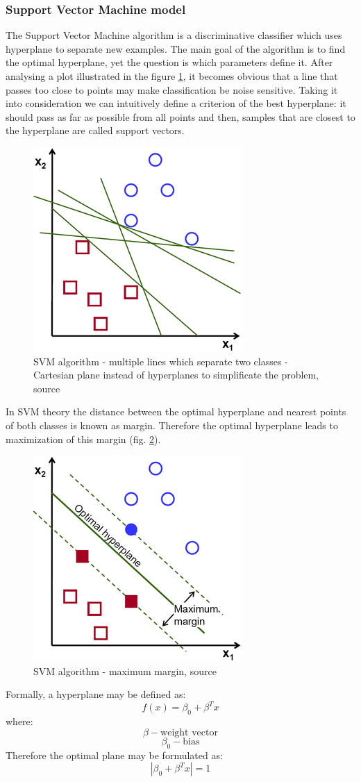 	\subsubsection{Support Vector Machine model} \label{soa-svm}
	The Support Vector Machine algorithm is a discriminative classifier which uses hyperplane to separate new examples. The main goal of the algorithm is to find the optimal hyperplane, yet the question is which parameters define it. After analysing a plot illustrated in the figure \ref{svm-plot}, it becomes obvious that a line that passes too close to points may make classification be noise sensitive.  Taking it into consideration we can intuitively define a criterion of the best hyperplane: it should pass as far as possible from all points and then, samples that are closest to the hyperplane are called support vectors.
		\begin{figure}[H]
	\begin{center}
	\includegraphics[width=0.4\linewidth]{images/svm-plot.png}
	\caption{SVM algorithm - multiple lines which separate two classes - Cartesian plane instead of hyperplanes to simplificate the problem, source \cite{svm-plot} }
	\label{svm-plot}
	\end{center}
	\end{figure}
	In SVM theory the distance between the optimal hyperplane and nearest points of both classes is known as margin. Therefore the optimal hyperplane leads to maximization of this margin (fig. \ref{svm-plot2}).
	\begin{figure}[H]
	\begin{center}
	\includegraphics[width=0.4\linewidth]{images/svm-plot2.png}
	\caption{SVM algorithm - maximum margin, source \cite{svm-plot} }
	\label{svm-plot2}
	\end{center}
	\end{figure}
	Formally, a hyperplane may be defined as:
	\[f(x)=\beta_0+\beta^Tx\]
where:
 \[\beta - \text{weight vector}\]  
 \[\beta_0 - \text{bias}\]  
 Therefore the optimal plane may be formulated as:
 \[\left | \beta_0+\beta^Tx \right | = 1\]

